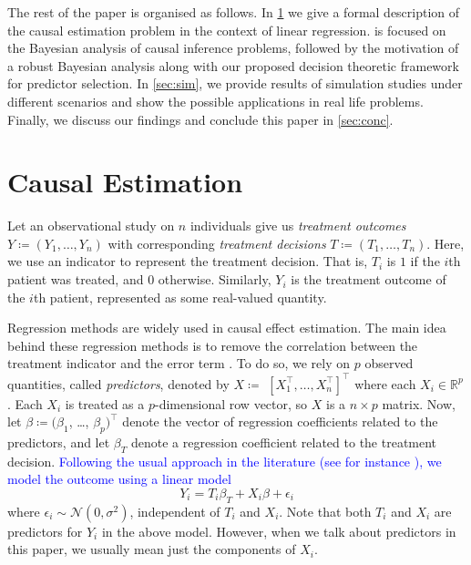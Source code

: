 \documentclass[preprint,12pt]{elsarticle}
\newcommand{\added}[1]{\textcolor{blue}{#1}}
\begin{document}
The rest of the paper is organised as follows. In \cref{sec:causal}
we give a formal description of the causal estimation problem in the
context of linear regression.  is focused on the
Bayesian analysis of causal inference problems, followed by the
motivation of a robust Bayesian analysis along with our proposed decision 
theoretic framework for predictor selection. In \cref{sec:sim}, 
we provide results of simulation studies under different scenarios 
and show the possible applications in real life problems. Finally, 
we discuss our findings and conclude this paper in \cref{sec:conc}.

\section{Causal Estimation}\label{sec:causal}

Let an observational study on $n$ individuals give us
\emph{treatment outcomes} $Y\coloneqq(Y_1, \dots, Y_n)$ with 
corresponding \emph{treatment decisions} $T\coloneqq(T_1, \dots, T_n)$.
Here, we use an indicator to represent the treatment decision. That is, $T_i$ is $1$ if the $i$th patient was treated, and $0$ otherwise. Similarly,
$Y_i$ is the treatment outcome of the $i$th patient, represented as some real-valued quantity.

Regression methods are widely used in causal effect estimation. The
main idea behind these regression methods is to remove the
correlation between the treatment indicator and the error term
\citep{winship99,HECKMAN1985}.
To do so, we rely on $p$ observed quantities, called
\emph{predictors}, denoted by $X\coloneqq$ $[X_1^{\top}, \dots, X_n^{\top}]^{\top}$
where each $X_i\in\mathbb{R}^p$.
Each $X_i$ is treated as a $p$-dimensional row vector,
so $X$ is a $n\times p$ matrix.
Now, let
$\beta \coloneqq (\beta_1$, \dots, $\beta_p)^{\top}$ denote the vector of regression
coefficients
related to the predictors, and let $\beta_T$ denote a regression coefficient related to the
treatment decision.
\added{%
Following the usual approach in the literature
(see for instance \citep{winship99,HECKMAN1985}),
we model the outcome using a linear model%
}
\begin{equation}
	Y_i =  T_i \beta_{T} + X_i\beta + \epsilon_i
\end{equation}
where $\epsilon_i\sim \mathcal{N}(0, \sigma^2)$,
independent of $T_i$ and $X_i$.
Note that both $T_i$ and $X_i$ are predictors for $Y_i$ in the above model.
However, when we talk about predictors in this paper, we usually mean just the components of $X_i$.
\end{document}
